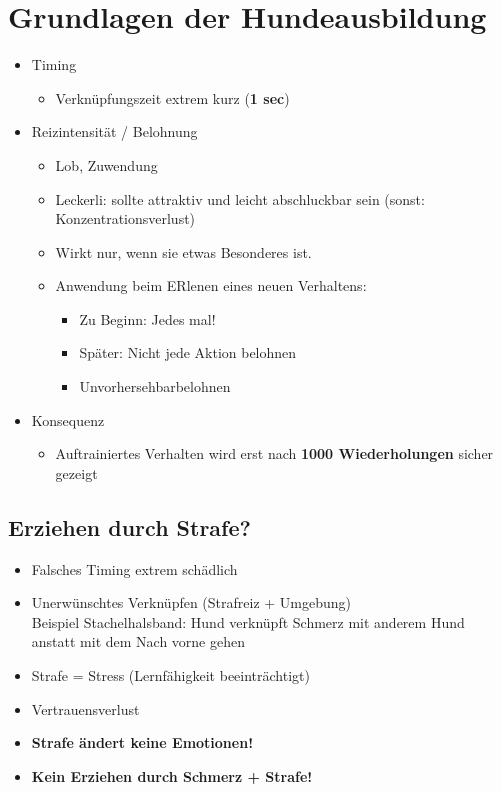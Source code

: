 \section{Grundlagen der Hundeausbildung}

\begin{itemize}
    \item Timing
    \begin{itemize}
        \item Verknüpfungszeit extrem kurz (\textbf{1 sec})
    \end{itemize}
    \item Reizintensität / Belohnung
        \begin{itemize}
            \item Lob, Zuwendung
            \item Leckerli: sollte attraktiv und leicht abschluckbar sein (sonst: Konzentrationsverlust)
            \item Wirkt nur, wenn sie etwas Besonderes ist.
            \item Anwendung beim ERlenen eines neuen Verhaltens:
                \begin{itemize}
                    \item Zu Beginn: Jedes mal!
                    \item Später: Nicht jede Aktion belohnen
                    \item \glqq Unvorhersehbar\grqq belohnen
                \end{itemize}
        \end{itemize}
    \item Konsequenz
        \begin{itemize}
            \item Auftrainiertes Verhalten wird erst nach \textbf{1000 Wiederholungen} sicher gezeigt
        \end{itemize}
\end{itemize}

    \subsection{Erziehen durch Strafe?}
        \begin{itemize}
            \item Falsches Timing extrem schädlich
            \item Unerwünschtes Verknüpfen (Strafreiz + Umgebung) \\
                  Beispiel Stachelhalsband: Hund verknüpft Schmerz mit anderem Hund anstatt mit dem \glqq Nach vorne gehen\grqq
            \item Strafe = Stress (Lernfähigkeit beeinträchtigt)
            \item Vertrauensverlust
            \item \textbf{Strafe ändert keine Emotionen!}
            \item \textbf{Kein Erziehen durch Schmerz + Strafe!}
        \end{itemize}

